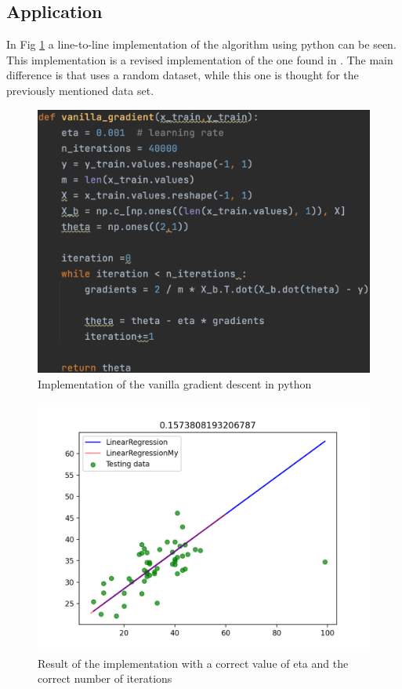 \documentclass[conference]{IEEEtran}
\begin{document}
\subsection{Application}
In Fig \ref{fig:va_gr} a line-to-line implementation of the algorithm using python can be seen. This implementation is a revised implementation of the one found in \cite{Scikit-Learn}. The main difference is that \cite{Scikit-Learn} uses a random dataset, while this one is thought for the previously mentioned data set. 
\begin{figure}[ht]
    \includegraphics[scale=0.4]{vanilla_gradient.png}
    \caption{Implementation of the vanilla gradient descent in python}
    \label{fig:va_gr}
\end{figure}

\begin{figure}[ht]
    \includegraphics[scale=0.5]{Figure_1.png}
    \caption{Result of the implementation with a correct value of eta and the correct number of iterations}
    \label{fig:va_gr_ben}
\end{figure}
\end{document}
